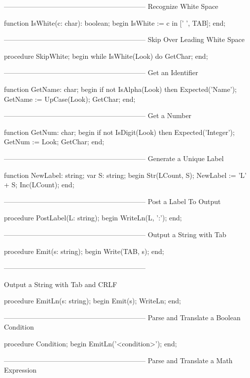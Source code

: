 \documentclass[float=false, crop=false]{standalone}
\begin{document}
\begin{code}
{--------------------------------------------------------------}
{ Recognize White Space }

function IsWhite(c: char): boolean;
begin
   IsWhite := c in [' ', TAB];
end;


{--------------------------------------------------------------}
{ Skip Over Leading White Space }

procedure SkipWhite;
begin
   while IsWhite(Look) do
      GetChar;
end;


{--------------------------------------------------------------}
{ Get an Identifier }

function GetName: char;
begin
   if not IsAlpha(Look) then Expected('Name');
   GetName := UpCase(Look);
   GetChar;
end;




{--------------------------------------------------------------}
{ Get a Number }

function GetNum: char;
begin
   if not IsDigit(Look) then Expected('Integer');
   GetNum := Look;
   GetChar;
end;


{--------------------------------------------------------------}
{ Generate a Unique Label }

function NewLabel: string;
var S: string;
begin
   Str(LCount, S);
   NewLabel := 'L' + S;
   Inc(LCount);
end;


{--------------------------------------------------------------}
{ Post a Label To Output }

procedure PostLabel(L: string);
begin
   WriteLn(L, ':');
end;


{--------------------------------------------------------------}
{ Output a String with Tab }

procedure Emit(s: string);
begin
   Write(TAB, s);
end;


{--------------------------------------------------------------}

{ Output a String with Tab and CRLF }

procedure EmitLn(s: string);
begin
   Emit(s);
   WriteLn;
end;


{--------------------------------------------------------------}
{ Parse and Translate a Boolean Condition }

procedure Condition;
begin
   EmitLn('<condition>');
end;




{--------------------------------------------------------------}
{ Parse and Translate a Math Expression }


\end{code}
\end{document}
